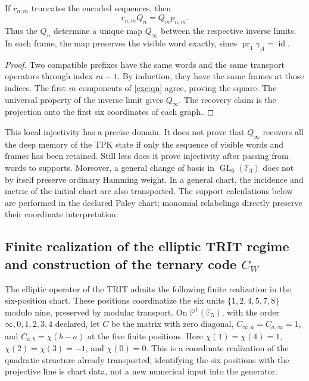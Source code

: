 \begin{proposition}
\label{exc:limite-inverso}
If $r_{n,m}$ truncates the encoded sequences, then
\[
 r_{n,m}Q_n=Q_m p_{n,m}.
\]
Thus the $Q_n$ determine a unique map $Q_\infty$ between the
respective inverse limits. In each frame, the map preserves the visible word
exactly, since $\operatorname{pr}_1\gamma_A=\operatorname{id}$.
\end{proposition}

\begin{proof}
Two compatible prefixes have the same words and the same
transport operators through index $m-1$. By induction, they have
the same frames at those indices. The first $m$ components of
\eqref{exc:qn} agree, proving the square. The universal
property of the inverse limit gives $Q_\infty$. The recovery claim
is the projection onto the first six coordinates of each graph.
\end{proof}

This local injectivity has a precise domain. It does not prove that
$Q_\infty$ recovers all the deep memory of the TPK state if only
the sequence of visible words and frames has been retained. Still less
does it prove injectivity after passing from words to supports.
Moreover, a general change of basis in $\operatorname{GL}_6(\mathbb F_3)$
does not by itself preserve ordinary Hamming weight. In a general
chart, the incidence and metric of the initial chart are also
transported. The support calculations below are performed in the
declared Paley chart; monomial relabelings directly preserve their
coordinate interpretation.

\subsection{Finite realization of the elliptic TRIT regime and construction of the
ternary code \texorpdfstring{$C_W$}{CW}}
\label{exc:paley-codigo}

The elliptic operator of the TRIT admits the following finite realization in
the six-position chart. These positions coordinatize the six units
$\{1,2,4,5,7,8\}$ modulo nine, preserved by modular transport.
On $\mathbb P^1(\mathbb F_5)$, with
the order $\infty,0,1,2,3,4$ declared, let $C$ be the matrix with zero
diagonal, $C_{\infty,a}=C_{a,\infty}=1$, and
$C_{a,b}=\chi(b-a)$ at the five finite positions. Here
$\chi(1)=\chi(4)=1$, $\chi(2)=\chi(3)=-1$, and $\chi(0)=0$.
This is a coordinate realization of the quadratic structure already
transported; identifying the six positions with the projective
line is chart data, not a new numerical input into the
generator.

